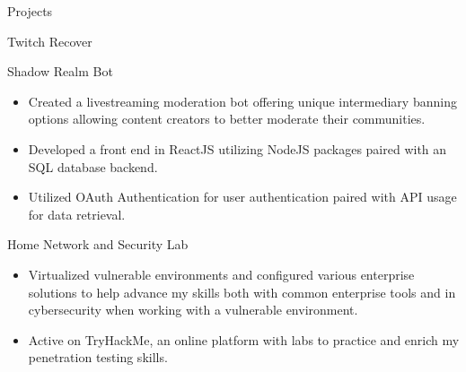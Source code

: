 \documentclass{article}
\newlength{\tabin}
\newlength{\secsep}
\newcommand{\lineunder}{\vspace*{-8pt} \\ \hspace*{-6pt} \hrulefill \\ \vspace*{-15pt}}
\newenvironment{tabbedsection}[1]{
  \begin{list}{}{
      \setlength{\itemsep}{0pt}
      \setlength{\labelsep}{0pt}
      \setlength{\labelwidth}{0pt}
      \setlength{\leftmargin}{\tabin}
      \setlength{\rightmargin}{\tabin}
      \setlength{\listparindent}{0pt}
      \setlength{\parsep}{0pt}
      \setlength{\parskip}{0pt}
      \setlength{\partopsep}{0pt}
      \setlength{\topsep}{#1}
    }
  \item[]
}{\end{list}}
\newenvironment{resume_section}[1]{
  \filbreak
  \vspace{2\secsep}
  \textsc{\large#1}
  \lineunder
  \begin{tabbedsection}{\secsep}
}{\end{tabbedsection}}
\newenvironment{resume_subsection}[2][]{
  \textbf{#2} \hfill {\normalsize #1} \hspace{-5em}
  \begin{tabbedsection}{0.5\secsep}
}{\end{tabbedsection}}
\newenvironment{subitems}{
  \renewcommand{\labelitemi}{-}
  \begin{itemize}
      \setlength{\labelsep}{1em}
}{\end{itemize}}
\begin{document}
\begin{resume_section}{Projects}
\begin{resume_subsection}{Twitch Recover}
	\end{resume_subsection}
	\vspace{2\secsep}
	\begin{resume_subsection}{Shadow Realm Bot}
		\begin{subitems}
			\item Created a livestreaming moderation bot offering unique intermediary banning options allowing content creators to better moderate their communities.
			\item Developed a front end in ReactJS utilizing NodeJS packages paired with an SQL database backend.
			\item Utilized OAuth Authentication for user authentication paired with API usage for data retrieval.
		\end{subitems}
	\end{resume_subsection}
	\vspace{2\secsep}
  	\begin{resume_subsection}{Home Network and Security Lab}
  		\begin{subitems}
  			\item Virtualized vulnerable environments and configured various enterprise solutions to help advance my skills both with common enterprise tools and in cybersecurity when working with a vulnerable environment.
  			\item Active on TryHackMe, an online platform with labs to practice and enrich my penetration testing skills.
  		\end{subitems}
  	\end{resume_subsection}
\end{resume_section}

\vspace{2\secsep}
\end{document}
